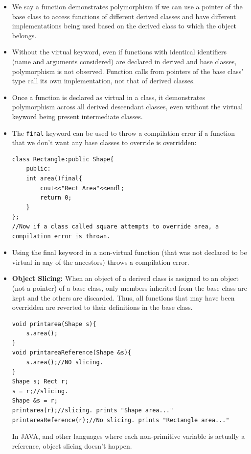 \documentclass{report}
\begin{document}
\begin{itemize}
\item We say a function demonstrates polymorphism if we can use a pointer of the base class
to access functions of different derived classes and have different implementations
being used based on the derived class to which the object belongs. 
\item Without the virtual keyword, even if functions with identical identifiers (name
and arguments considered) are declared in derived and base classes, polymorphism is not
observed. Function calls from pointers of the base class' type call its own implementation,
not that of derived classes. 
\item Once a function is declared as virtual in a class, it demonstrates polymorphism 
across all derived descendant classes, even without the virtual keyword being present 
intermediate classes.
\item The \texttt{final} keyword can be used to throw a compilation error if a function
that we don't want any base classes to override is overridden:
\begin{lstlisting}
class Rectangle:public Shape{
    public:
    int area()final{
        cout<<"Rect Area"<<endl;
        return 0;
    }
};
//Now if a class called square attempts to override area, a compilation error is thrown.
\end{lstlisting}
\item Using the final keyword in a non-virtual function (that was not declared to be virtual in any of the ancestors) throws a compilation error.
\item \textbf{Object Slicing:} When an object of a derived class is assigned to an object (not a pointer) of
a base class, only members inherited from the base class are kept and the others are discarded. Thus,
all functions that may have been overridden are reverted to their definitions in the base class.
\begin{lstlisting}
void printarea(Shape s){
    s.area();
}
void printareaReference(Shape &s){
    s.area();//NO slicing. 
}
Shape s; Rect r;
s = r;//slicing.
Shape &s = r;
printarea(r);//slicing. prints "Shape area..."
printareaReference(r);//No slicing. prints "Rectangle area..."
\end{lstlisting}
In JAVA, and other languages where each non-primitive variable is actually a reference, object
slicing doesn't happen.
\end{itemize}
\end{document}
